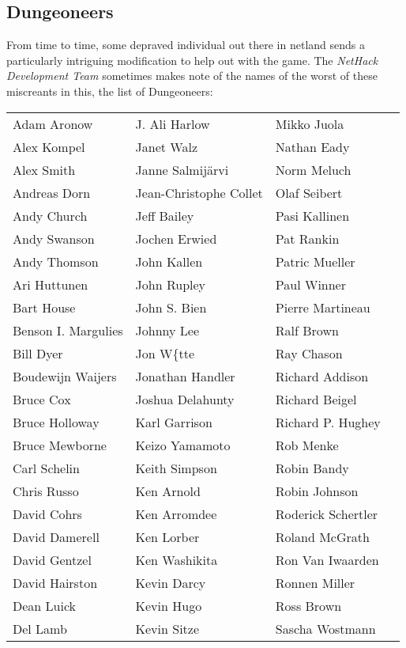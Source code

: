 \subsection*{Dungeoneers}
\nd From time to time, some depraved individual out there in netland sends a
particularly intriguing modification to help out with the game.  The
{\it NetHack Development Team} sometimes makes note of the names of the worst
of these miscreants in this, the list of Dungeoneers:
\medskip
\begin{center}
\begin{tabular}{llll}
Adam Aronow & J. Ali Harlow & Mikko Juola\\
Alex Kompel & Janet Walz & Nathan Eady\\
Alex Smith & Janne Salmij\"{a}rvi & Norm Meluch\\
Andreas Dorn & Jean-Christophe Collet & Olaf Seibert\\
Andy Church & Jeff Bailey & Pasi Kallinen\\
Andy Swanson & Jochen Erwied & Pat Rankin\\
Andy Thomson & John Kallen & Patric Mueller\\
Ari Huttunen & John Rupley & Paul Winner\\
Bart House & John S. Bien & Pierre Martineau\\
Benson I. Margulies & Johnny Lee & Ralf Brown\\
Bill Dyer & Jon W\{tte & Ray Chason\\
Boudewijn Waijers & Jonathan Handler & Richard Addison\\
Bruce Cox & Joshua Delahunty & Richard Beigel\\
Bruce Holloway & Karl Garrison & Richard P. Hughey\\
Bruce Mewborne & Keizo Yamamoto & Rob Menke\\
Carl Schelin & Keith Simpson & Robin Bandy\\
Chris Russo & Ken Arnold & Robin Johnson\\
David Cohrs & Ken Arromdee & Roderick Schertler\\
David Damerell & Ken Lorber & Roland McGrath\\
David Gentzel & Ken Washikita & Ron Van Iwaarden\\
David Hairston & Kevin Darcy & Ronnen Miller\\
Dean Luick & Kevin Hugo & Ross Brown\\
Del Lamb & Kevin Sitze & Sascha Wostmann\\

\end{tabular}
\end{center}

